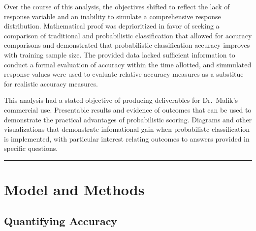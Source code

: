 \documentclass[12pt,]{article}
\begin{document}
Over the course of this analysis, the objectives shifted to reflect the
lack of response variable and an inability to simulate a comprehensive
response distribution. Mathematical proof was deprioritized in favor of
seeking a comparison of traditional and probabilistic classification
that allowed for accuracy comparisons and demonstrated that
probabilistic classification accuracy improves with training sample
size. The provided data lacked sufficient information to conduct a
formal evaluation of accuracy within the time allotted, and simmulated
response values were used to evaluate relative accuracy measures as a
substitue for realistic accuracy measures.

This analysis had a stated objective of producing deliverables for
Dr.~Malik's commercial use. Presentable results and evidence of outcomes
that can be used to demonstrate the practical advantages of
probabilistic scoring. Diagrams and other visualizations that
demonstrate infomational gain when probabilistc classification is
implemented, with particular interest relating outcomes to answers
provided in specific questions.

\begin{center}\rule{0.5\linewidth}{\linethickness}\end{center}

\hypertarget{model-and-methods}{%
\section{Model and Methods}\label{model-and-methods}}

\hypertarget{quantifying-accuracy}{%
\subsection{Quantifying Accuracy}\label{quantifying-accuracy}}
\end{document}
